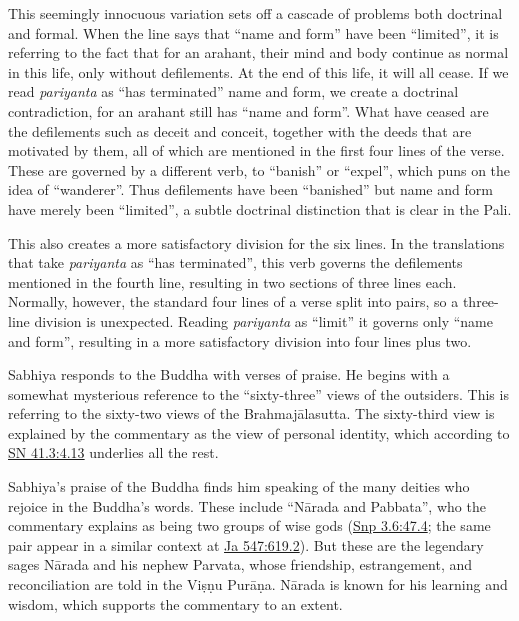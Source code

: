 \documentclass[12pt,openany]{book}%
\begin{document}
This seemingly innocuous variation sets off a cascade of problems both doctrinal and formal. When the line says that “name and form” have been “limited”, it is referring to the fact that for an arahant, their mind and body continue as normal in this life, only without defilements. At the end of this life, it will all cease. If we read \textit{pariyanta} as “has terminated” name and form, we create a doctrinal contradiction, for an arahant still has “name and form”. What have ceased are the defilements such as deceit and conceit, together with the deeds that are motivated by them, all of which are mentioned in the first four lines of the verse. These are governed by a different verb, to “banish” or “expel”, which puns on the idea of “wanderer”. Thus defilements have been “banished” but name and form have merely been “limited”, a subtle doctrinal distinction that is clear in the Pali.

This also creates a more satisfactory division for the six lines. In the translations that take \textit{pariyanta} as “has terminated”, this verb governs the defilements mentioned in the fourth line, resulting in two sections of three lines each. Normally, however, the standard four lines of a verse split into pairs, so a three-line division is unexpected. Reading \textit{pariyanta} as “limit” it governs only “name and form”, resulting in a more satisfactory division into four lines plus two. 

Sabhiya responds to the Buddha with verses of praise. He begins with a somewhat mysterious reference to the “sixty-three” views of the outsiders. This is referring to the sixty-two views of the \textsanskrit{Brahmajālasutta}. The sixty-third view is explained by the commentary as the view of personal identity, which according to \href{https://suttacentral.net/sn41.3/en/sujato\#4.13}{SN 41.3:4.13} underlies all the rest.

Sabhiya’s praise of the Buddha finds him speaking of the many deities who rejoice in the Buddha’s words. These include “\textsanskrit{Nārada} and Pabbata”, who the commentary explains as being two groups of wise gods (\href{https://suttacentral.net/snp3.6/en/sujato\#47.4}{Snp 3.6:47.4}; the same pair appear in a similar context at \href{https://suttacentral.net/ja547}{Ja 547:619.2}). But these are the legendary sages \textsanskrit{Nārada} and his nephew Parvata, whose friendship, estrangement, and reconciliation are told in the \textsanskrit{Viṣṇu} \textsanskrit{Purāṇa}. \textsanskrit{Nārada} is known for his learning and wisdom, which supports the commentary to an extent. 
\end{document}

